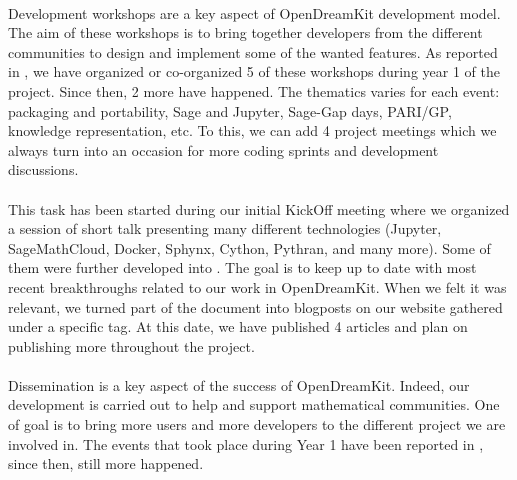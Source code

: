 \documentclass{deliverablereport}
\begin{document}
\paragraph{}

Development workshops are a key aspect of OpenDreamKit development model. The aim of these workshops is to bring together developers from the different communities to design and implement some 
of the wanted features. As reported in , we have organized
or co-organized 5 of these workshops during year 1 of the project. Since then, 2 more have happened. The thematics varies
for each event: packaging and portability, Sage and Jupyter, Sage-Gap days, PARI/GP, knowledge representation, etc. To this,
we can add 4 project meetings which we always turn into an occasion for more coding sprints and development
discussions.

\paragraph{}

This task has been started during our initial KickOff meeting where we organized a session of short
talk presenting many different technologies (Jupyter, SageMathCloud, Docker, Sphynx, Cython, Pythran, and
many more). Some of them were further developed into . The goal is to
keep up to date with most recent breakthroughs related to our work in OpenDreamKit. When we felt
it was relevant, we turned part of the document into blogposts on our website gathered under a 
specific tag. At this date, we have published 4 articles and plan on publishing more throughout the
project.

\paragraph{}

Dissemination is a key aspect of the success of OpenDreamKit. Indeed, our development is carried
out to help and support mathematical communities. One of goal is to bring
more users and more developers to the different project we are involved in. The events
that took place during Year 1 have been reported in , since then, still
more happened.
\end{document}
